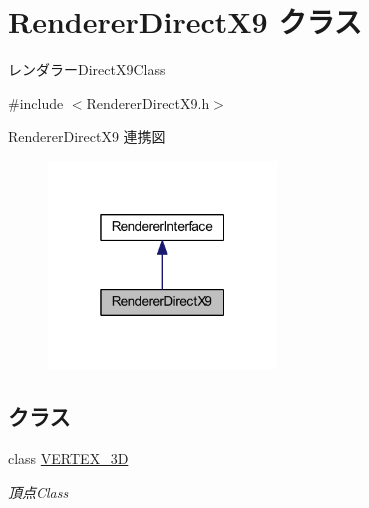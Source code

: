 \hypertarget{class_renderer_direct_x9}{}\section{Renderer\+Direct\+X9 クラス}
\label{class_renderer_direct_x9}


レンダラー\+Direct\+X9\+Class  




{\ttfamily \#include $<$Renderer\+Direct\+X9.\+h$>$}



Renderer\+Direct\+X9 連携図\nopagebreak
\begin{figure}[H]
\begin{center}
\leavevmode
\includegraphics[width=172pt]{class_renderer_direct_x9__coll__graph}
\end{center}
\end{figure}
\subsection*{クラス}
\begin{DoxyCompactItemize}
\item 
class \mbox{\hyperlink{class_renderer_direct_x9_1_1_v_e_r_t_e_x__3_d}{V\+E\+R\+T\+E\+X\+\_\+3D}}
\begin{DoxyCompactList}\small\item\em 頂点\+Class \end{DoxyCompactList}\end{DoxyCompactItemize}
